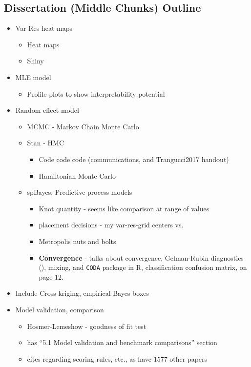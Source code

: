 \documentclass{article}
\begin{document}
\subsection*{Dissertation (Middle Chunks) Outline} %
\begin{itemize}
\item Var-Res heat maps
  \begin{itemize}
  \item Heat maps
  \item Shiny
  \end{itemize}
\item MLE model
  \begin{itemize}
  \item Profile plots to show interpretability potential
  \end{itemize}
\item Random effect model
  \begin{itemize}
  \item MCMC - Markov Chain Monte Carlo
  \item Stan - HMC
          \begin{itemize}
          \item Code code code (communications, and Trangucci2017 handout)
          \item Hamiltonian Monte Carlo \citep{Neal2011}
          \end{itemize}
  \item spBayes, Predictive process models
          \begin{itemize}
          \item Knot quantity - seems like comparison at range of values
          \item placement decisions - my var-res-grid centers vs. \citep{Nychka1998}
          \item Metropolis nuts and bolts
          \item {\bf Convergence} - \cite{Finley2011} talks about convergence, Gelman-Rubin diagnostics (\citep{Gelman2014}), mixing, and \verb|CODA| package in R, classification confusion matrix, on page 12.
          \end{itemize}
  \end{itemize}
\item Include Cross kriging, empirical Bayes boxes
\item Model validation, comparison
      \begin{itemize}
      \item Hosmer-Lemeshow - goodness of fit test
      \item \cite{Finley2011} has ``5.1 Model validation and benchmark comparisons'' section
      \item \cite{Finley2011} cites \cite{Gneiting2007} regarding scoring rules, etc., as have 1577 other papers
      \end{itemize}
\end{itemize}
\end{document}
